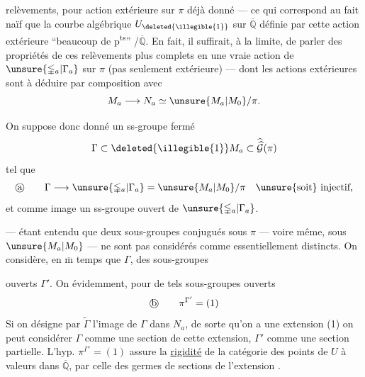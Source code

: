 
 relèvements, pour  action extérieure sur $\pi$ déjà donné --- ce qui correspond au fait naïf que la courbe algébrique $U_{\deleted{\illegible{1}}}$ sur $\overline{\mathbb Q}$ définie par cette action extérieure  ``beaucoup de p\textsuperscript{ts}'' /$\overline{\mathbb Q}$. En fait, il suffirait, à la limite, de parler des  propriétés de ces relèvements plus complets en une vraie action de  $\unsure{\mathbb{\Gamma}_a|\Gamma_a}$ sur $\pi$ (pas seulement extérieure) --- dont les actions extérieures sont à déduire par composition avec
\[
M_a \longrightarrow N_a \simeq \unsure{M_a|M_0}/\pi.
\]

 On suppose donc donné un ss-groupe fermé
\[
\Gamma \subset \deleted{\illegible{1}} M_a \subset \widehat{\widehat{\mathcal G}}(\pi)
\]
tel que
\[
\text{\textcircled{a}}\qquad
\Gamma \longrightarrow \unsure{\mathbb{\Gamma}_a|\Gamma_a}
 = \unsure{M_a|M_0}/\pi
\quad \text{\unsure{soit} injectif,}
\]
et  comme image un ss-groupe ouvert de $\unsure{\mathbb{\Gamma}_a|\Gamma_a}$.

--- étant entendu que deux sous-groupes conjugués sous $\pi$ --- voire même,  sous $\unsure{M_a|M_0}$ --- ne sont pas considérés comme essentiellement distincts. On considère, en $\overline{\mathrm m}$ temps que $\Gamma$, des sous-groupes


ouverts $\Gamma'$. On  évidemment, pour de tels sous-groupes ouverts
\[
\text{\textcircled{b}}\qquad \pi^{\Gamma'}=(1)
\]
Si on désigne par $\widetilde{\Gamma}$ l'image de $\Gamma$ dans $N_a$, de sorte qu'on a une extension
(1)\quad
{}
on peut considérer $\Gamma$ comme une section de cette extension, $\Gamma'$ comme une section partielle. L'hyp. $\pi^{\Gamma'}=(1)$ assure la \uline{rigidité} de la catégorie des points de $U$ à valeurs dans $\overline{\mathbb Q}$,  par celle des germes de sections de l'extension .

